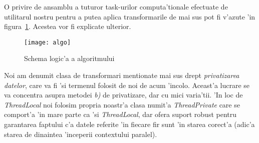 
O privire de ansamblu a tuturor task-urilor computa'tionale efectuate de
utilitarul nostru pentru a putea aplica transformarile de mai sus pot fi
v'azute 'in figura~\ref{algo}. Acestea vor fi explicate ulterior.


\begin{figure}[h!]
\begin{center}
  \texttt{[image: algo]}
  \caption{Schema logic'a a algoritmului}
  \label{algo}
\end{center}
\end{figure}

Noi am denumit clasa de transformari mentionate mai sus drept \emph{privatizarea
datelor}, care va fi 'si termenul folosit de noi de acum 'incolo. Aceast'a
lucrare se va concentra asupra metodei \emph{b)} de privatizare, dar cu mici
varia'tii. 'In loc de \emph{ThreadLocal} noi folosim propria noastr'a clasa
numit'a \emph{ThreadPrivate} care se comport'a 'in mare parte ca 'si
\emph{ThreadLocal}, dar ofera suport robust pentru garantarea faptului c'a
datele referite 'in fiecare fir sunt 'in starea corect'a (adic'a starea de
dinaintea 'inceperii contextului paralel).

